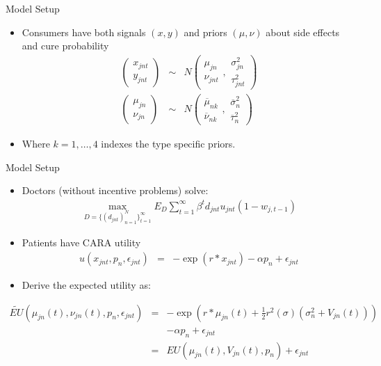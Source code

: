 \documentclass[xcolor=pdftex,dvipsnames,table,mathserif,aspectratio=169]{beamer}
\begin{document}
\begin{frame}{Model Setup}
\begin{itemize}
\item Consumers have both signals $(x,y)$ and priors $(\mu,\nu)$ about side effects and cure probability
\begin{eqnarray*}
\left( \begin{smallmatrix} x_{jnt} \\ y_{jnt} \end{smallmatrix} \right)
&\sim& N \left( \begin{smallmatrix} \mu_{jn} \\ \nu_{jnt} \end{smallmatrix}, \begin{smallmatrix} \sigma^2_{jn} \\ \tau_{jnt}^2 \end{smallmatrix} \right) \\
\left( \begin{smallmatrix} \mu_{jn} \\ \nu_{jn} \end{smallmatrix} \right)
&\sim& N \left( \begin{smallmatrix} \overline{\mu}_{nk} \\ \overline{\nu}_{nk} \end{smallmatrix}, \begin{smallmatrix} \overline{\sigma}^2_{n} \\ \overline{\tau}_{n}^2 \end{smallmatrix} \right)
\end{eqnarray*}
\item Where $k=1,\ldots,4$ indexes the \alert{type specific priors}. 
\end{itemize}
\end{frame}

\begin{frame}{Model Setup}
\begin{itemize}
\item Doctors (without incentive problems) solve:
\begin{eqnarray*}
\max_{D=\{(d_{jnt})_{n=1}^N \}_{t=1}^{\infty}} E_D \sum_{t=1}^{\infty} \beta^t d_{jnt} u_{jnt}(1 - w_{j,t-1})
\end{eqnarray*}
\item Patients have CARA utility
\begin{eqnarray*}
u(x_{jnt},p_n,\epsilon_{jnt}) &=& -\exp(r *x_{jnt}) - \alpha p_n + \epsilon_{jnt}
\end{eqnarray*}
\item Derive the expected utility as:
\end{itemize}
\vspace{-0.5cm}
\begin{eqnarray*}
\tilde{EU}(\mu_{jn}(t),\nu_{jn}(t), p_n,\epsilon_{jnt}) &=& -\exp(r *\mu_{jn}(t) + \frac{1}{2} r^2(\sigma) (\sigma^2_n + V_{jn}(t))) \\
&& - \alpha p_n + \epsilon_{jnt}\\
&=& EU(\mu_{jn}(t),V_{jn}(t),p_n) + \epsilon_{jnt}
\end{eqnarray*}
\end{frame}
\end{document}
